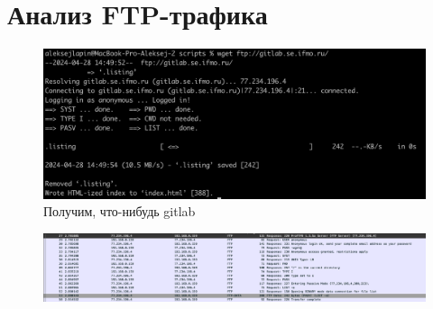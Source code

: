 \documentclass[12pt,onecolumn]{article}
\begin{document}
\section{Анализ FTP-трафика}
\begin{figure}[H]
    \centering
    \includegraphics*[width=\textwidth]{image/part7/ftp.png}
    \caption{Получим, что-нибудь gitlab}
\end{figure}
\begin{figure}[H]
    \centering
    \includegraphics*[width=\textwidth]{image/part7/ftp-ws.png}
\end{figure}
\end{document}
